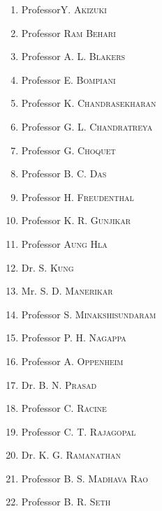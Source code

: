 \begin{enumerate}
\itemsep=2pt
\item Professor\pageoriginale \textsc{Y. Akizuki}

\item Professor \textsc{Ram Behari}

\item Professor \textsc{A. L. Blakers}

\item Professor \textsc{E. Bompiani}

\item Professor \textsc{K. Chandrasekharan}

\item Professor \textsc{G. L. Chandratreya}

\item Professor \textsc{G. Choquet}

\item Professor \textsc{B. C. Das}

\item Professor \textsc{H. Freudenthal}

\item Professor \textsc{K. R. Gunjikar}

\item Professor \textsc{Aung Hla}

\item Dr. \textsc{S. Kung}

\item Mr. \textsc{S. D. Manerikar}

\item Professor \textsc{S. Minakshisundaram}

\item Professor \textsc{P. H. Nagappa}

\item Professor \textsc{A. Oppenheim}

\item Dr. \textsc{B. N. Prasad}

\item Professor \textsc{C. Racine}

\item Professor \textsc{C. T. Rajagopal}

\item Dr. \textsc{K. G. Ramanathan}

\item Professor \textsc{B. S. Madhava Rao}

\item Professor \textsc{B. R. Seth}


\end{enumerate}
